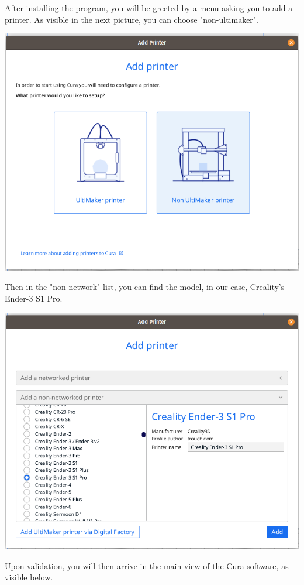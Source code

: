 \documentclass[a4paper,11pt]{article}
\begin{document}
After installing the program, you will be greeted by a menu asking you to add a printer.
As visible in the next picture, you can choose "non-ultimaker".

\begin{center}
\includegraphics[width=.9\linewidth]{img/cura/1.png}
\end{center}

Then in the "non-network" list, you can find the model, in our case, Creality's Ender-3 S1 Pro.

\begin{center}
\includegraphics[width=.95\linewidth]{img/cura/2.png}
\end{center}

Upon validation, you will then arrive in the main view of the Cura software, as visible below.
\end{document}
